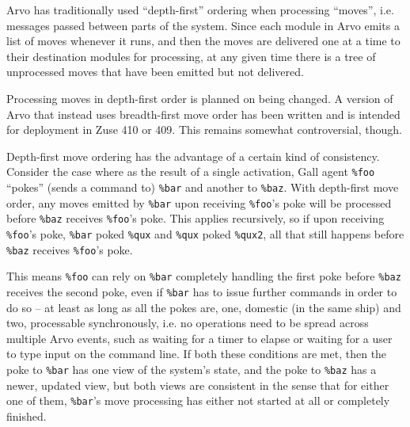 \documentclass[twoside]{article}
\begin{document}
Arvo has traditionally used ``depth-first'' ordering when processing ``moves'', i.e. messages passed between parts of the system.  Since each module in Arvo emits a list of moves whenever it runs, and then the moves are delivered one at a time to their destination modules for processing, at any given time there is a tree of unprocessed moves that have been emitted but not delivered.

Processing moves in depth-first order is planned on being changed.  A version of Arvo that instead uses breadth-first move order has been written and is intended for deployment in Zuse 410 or 409.  This remains somewhat controversial, though.

Depth-first move ordering has the advantage of a certain kind of consistency.  Consider the case where as the result of a single activation, Gall agent \lstinline[style=inlinecode]{%foo} ``pokes'' (sends a command to) \lstinline[style=inlinecode]{%bar} and another to \lstinline[style=inlinecode]{%baz}.  With depth-first move order, any moves emitted by \lstinline[style=inlinecode]{%bar} upon receiving \lstinline[style=inlinecode]{%foo}'s poke will be processed before \lstinline[style=inlinecode]{%baz} receives \lstinline[style=inlinecode]{%foo}'s poke.  This applies recursively, so if upon receiving \lstinline[style=inlinecode]{%foo}'s poke, \lstinline[style=inlinecode]{%bar} poked \lstinline[style=inlinecode]{%qux} and \lstinline[style=inlinecode]{%qux} poked \lstinline[style=inlinecode]{%qux2}, all that still happens before \lstinline[style=inlinecode]{%baz} receives \lstinline[style=inlinecode]{%foo}'s poke.

This means \lstinline[style=inlinecode]{%foo} can rely on \lstinline[style=inlinecode]{%bar} completely handling the first poke before \lstinline[style=inlinecode]{%baz} receives the second poke, even if \lstinline[style=inlinecode]{%bar} has to issue further commands in order to do so – at least as long as all the pokes are, one, domestic (in the same ship) and two, processable synchronously, i.e. no operations need to be spread across multiple Arvo events, such as waiting for a timer to elapse or waiting for a user to type input on the command line.  If both these conditions are met, then the poke to \lstinline[style=inlinecode]{%bar} has one view of the system's state, and the poke to \lstinline[style=inlinecode]{%baz} has a newer, updated view, but both views are consistent in the sense that for either one of them, \lstinline[style=inlinecode]{%bar}'s move processing has either not started at all or completely finished.
\end{document}
